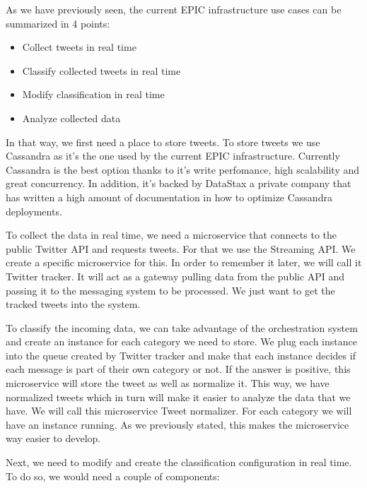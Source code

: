 As we have previously seen, the current EPIC infrastructure use cases can be summarized in 4 points:

\begin{itemize}
	\item Collect tweets in real time
	\item Classify collected tweets in real time
	\item Modify classification in real time
	\item Analyze collected data
\end{itemize}


In that way, we first need a place to store tweets. To store tweets we use Cassandra as it’s the one used by the current EPIC infrastructure. Currently Cassandra is the best option thanks to it’s write perfomance, high scalability and great concurrency. In addition, it’s backed by DataStax a private company that has written a high amount of documentation in how to optimize Cassandra deployments.

To collect the data in real time, we need a microservice that connects to the public Twitter API and requests tweets. For that we use the Streaming API. We create a specific microservice for this. In order to remember it later, we will call it Twitter tracker. It will act as a gateway pulling data from the public API and passing it to the messaging system to be processed. We just want to get the tracked tweets into the system.

To classify the incoming data, we can take advantage of the orchestration system and create an instance for each category we need to store. We plug each instance into the queue created by Twitter tracker and make that each instance decides if each message is part of their own category or not. If the answer is positive, this microservice will store the tweet as well as normalize it. This way, we have normalized tweets which in turn will make it easier to analyze the data that we have. We will call this microservice Tweet normalizer. For each category we will have an instance running. As we previously stated, this makes the microservice way easier to develop.

Next, we need to modify and create the classification configuration in real time. To do so, we would need a couple of components:

